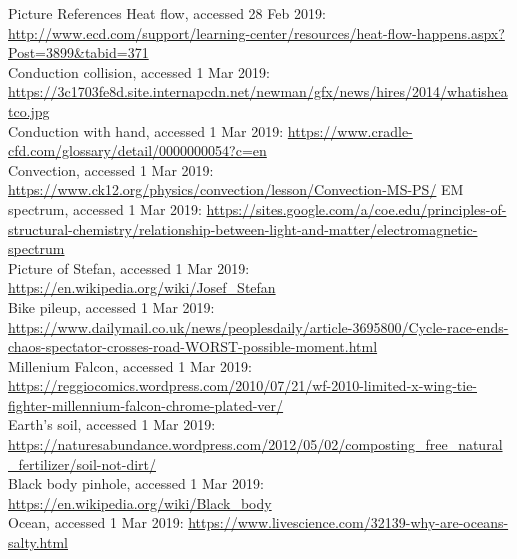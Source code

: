 \documentclass{beamer}
\begin{document}
\begin{frame}{Picture References}
Heat flow, accessed 28 Feb 2019: \href{http://www.ecd.com/support/learning-center/resources/heat-flow-happens.aspx?Post=3899\&tabid=371}{http://www.ecd.com/support/learning-center/resources/heat-flow-happens.aspx?Post=3899\&tabid=371}\\
Conduction collision, accessed 1 Mar 2019: \href{https://3c1703fe8d.site.internapcdn.net/newman/gfx/news/hires/2014/whatisheatco.jpg}{https://3c1703fe8d.site.internapcdn.net/newman/gfx/news/hires/2014/whatisheatco.jpg}\\
Conduction with hand, accessed 1 Mar 2019: \href{https://www.cradle-cfd.com/glossary/detail/0000000054?c=en}{https://www.cradle-cfd.com/glossary/detail/0000000054?c=en}\\
Convection, accessed 1 Mar 2019: \href{https://www.ck12.org/physics/convection/lesson/Convection-MS-PS/}{https://www.ck12.org/physics/convection/lesson/Convection-MS-PS/}
EM spectrum, accessed 1 Mar 2019: \href{https://sites.google.com/a/coe.edu/principles-of-structural-chemistry/relationship-between-light-and-matter/electromagnetic-spectrum}{https://sites.google.com/a/coe.edu/principles-of-structural-chemistry/relationship-between-light-and-matter/electromagnetic-spectrum}\\
Picture of Stefan, accessed 1 Mar 2019: \href{https://en.wikipedia.org/wiki/Josef_Stefan}{https://en.wikipedia.org/wiki/Josef\_Stefan}\\
Bike pileup, accessed 1 Mar 2019: \href{https://www.dailymail.co.uk/news/peoplesdaily/article-3695800/Cycle-race-ends-chaos-spectator-crosses-road-WORST-possible-moment.html}{https://www.dailymail.co.uk/news/peoplesdaily/article-3695800/Cycle-race-ends-chaos-spectator-crosses-road-WORST-possible-moment.html}\\
Millenium Falcon, accessed 1 Mar 2019: \href{https://reggiocomics.wordpress.com/2010/07/21/wf-2010-limited-x-wing-tie-fighter-millennium-falcon-chrome-plated-ver/}{https://reggiocomics.wordpress.com/2010/07/21/wf-2010-limited-x-wing-tie-fighter-millennium-falcon-chrome-plated-ver/}\\
Earth's soil, accessed 1 Mar 2019: \href{https://naturesabundance.wordpress.com/2012/05/02/composting_free_natural_fertilizer/soil-not-dirt/}{https://naturesabundance.wordpress.com/2012/05/02/composting\_free\_natural\_fertilizer/soil-not-dirt/}\\
Black body pinhole, accessed 1 Mar 2019: \href{https://en.wikipedia.org/wiki/Black_body}{https://en.wikipedia.org/wiki/Black\_body}\\
Ocean, accessed 1 Mar 2019: \href{https://www.livescience.com/32139-why-are-oceans-salty.html}{https://www.livescience.com/32139-why-are-oceans-salty.html}\\
\end{frame}
\end{document}

